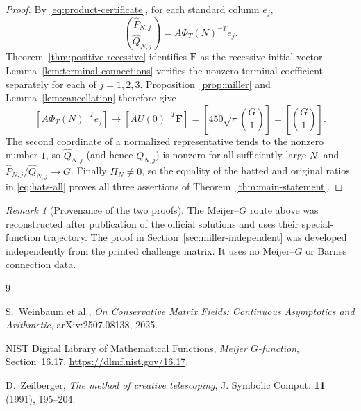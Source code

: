 \documentclass[11pt]{article}
\theoremstyle{remark}
\newtheorem{remark}{Remark}
\begin{document}
\begin{proof}
By \eqref{eq:product-certificate}, for each standard column $e_j$,
\begin{equation}\label{eq:hat-vector}
 \binom{\widehat P_{N,j}}{\widehat Q_{N,j}}
                   =A\Phi_T(N)^{-T}e_j.
\end{equation}
Theorem~\ref{thm:positive-recessive} identifies $\mathbf F$ as the
recessive initial vector.  Lemma~\ref{lem:terminal-connections}
verifies the nonzero terminal coefficient separately for each of
$j=1,2,3$.  Proposition~\ref{prop:miller} and
Lemma~\ref{lem:cancellation} therefore give
\[
 \left[A\Phi_T(N)^{-T}e_j\right]
 \longrightarrow
 \left[AU(0)^{-T}\mathbf F\right]
 =\left[450\sqrt\pi\binom G1\right]=\left[\binom G1\right].
\]
The second coordinate of a normalized representative tends to the
nonzero number $1$, so $\widehat Q_{N,j}$ (and hence $Q_{N,j}$) is
nonzero for all sufficiently large $N$, and
$\widehat P_{N,j}/\widehat Q_{N,j}\to G$.  Finally $H_N\ne0$, so
the equality of the hatted and original ratios in
\eqref{eq:hats-all} proves all three assertions of
Theorem~\ref{thm:main-statement}.
\end{proof}



\begin{remark}[Provenance of the two proofs]
The Meijer--$G$ route above was reconstructed after publication of the
official solutions and uses their special-function trajectory.  The proof in
Section~\ref{sec:miller-independent} was developed independently from the
printed challenge matrix.  It uses no Meijer--$G$ or Barnes connection data.
\end{remark}

\begin{thebibliography}{9}

S.~Weinbaum et al.,
\emph{On Conservative Matrix Fields: Continuous Asymptotics and Arithmetic},
arXiv:2507.08138, 2025.

NIST Digital Library of Mathematical Functions,
\emph{Meijer $G$-function}, Section~16.17,
\url{https://dlmf.nist.gov/16.17}.

D.~Zeilberger,
\emph{The method of creative telescoping},
J. Symbolic Comput. \textbf{11} (1991), 195--204.

\end{thebibliography}
\end{document}
